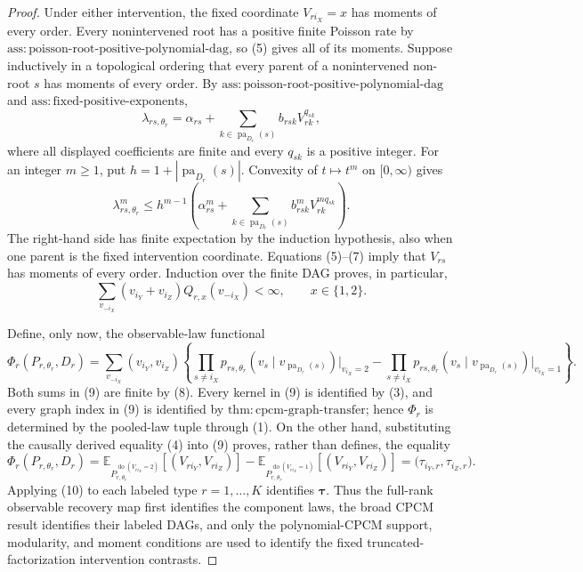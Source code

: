 \documentclass{article}
\begin{document}
\begin{proof}
Under either intervention, the fixed coordinate \(V_{r i_X}=x\) has moments of every order.  Every nonintervened root has a positive finite Poisson rate by \(\mathrm{ass{:}poisson\text{-}root\text{-}positive\text{-}polynomial\text{-}dag}\), so (5) gives all of its moments.  Suppose inductively in a topological ordering that every parent of a nonintervened non-root \(s\) has moments of every order.  By \(\mathrm{ass{:}poisson\text{-}root\text{-}positive\text{-}polynomial\text{-}dag}\) and \(\mathrm{ass{:}fixed\text{-}positive\text{-}exponents}\),
\[
\lambda_{rs,\theta_r}
=\alpha_{rs}+
\sum_{k\in\operatorname{pa}_{D_r}(s)}
b_{rsk}V_{rk}^{q_{sk}}, \tag{6}
\]
where all displayed coefficients are finite and every \(q_{sk}\) is a positive integer.  For an integer \(m\geq1\), put \(h=1+|\operatorname{pa}_{D_r}(s)|\).  Convexity of \(t\mapsto t^m\) on \([0,\infty)\) gives
\[
\lambda_{rs,\theta_r}^{m}
\leq h^{m-1}\!\left(
\alpha_{rs}^{m}+
\sum_{k\in\operatorname{pa}_{D_r}(s)}
b_{rsk}^{m}V_{rk}^{m q_{sk}}
\right). \tag{7}
\]
The right-hand side has finite expectation by the induction hypothesis, also when one parent is the fixed intervention coordinate.  Equations (5)--(7) imply that \(V_{rs}\) has moments of every order.  Induction over the finite DAG proves, in particular,
\[
\sum_{v_{-i_X}}(v_{i_Y}+v_{i_Z})Q_{r,x}(v_{-i_X})<\infty,
\qquad x\in\{1,2\}. \tag{8}
\]

Define, only now, the observable-law functional
\[
\Phi_r(P_{r,\theta_r},D_r)
=\sum_{v_{-i_X}}(v_{i_Y},v_{i_Z})
\left\{
\prod_{s\ne i_X}p_{rs,\theta_r}\!\left(v_s\mid
v_{\operatorname{pa}_{D_r}(s)}\right)\Big|_{v_{i_X}=2}
-
\prod_{s\ne i_X}p_{rs,\theta_r}\!\left(v_s\mid
v_{\operatorname{pa}_{D_r}(s)}\right)\Big|_{v_{i_X}=1}
\right\}. \tag{9}
\]
Both sums in (9) are finite by (8).  Every kernel in (9) is identified by (3), and every graph index in (9) is identified by \(\mathrm{thm{:}cpcm\text{-}graph\text{-}transfer}\); hence \(\Phi_r\) is determined by the pooled-law tuple through (1).  On the other hand, substituting the causally derived equality (4) into (9) proves, rather than defines, the equality
\[
\Phi_r(P_{r,\theta_r},D_r)
=\mathbb E_{P_{r,\theta_r}^{\operatorname{do}(V_{r i_X}=2)}}
[(V_{r i_Y},V_{r i_Z})]
-\mathbb E_{P_{r,\theta_r}^{\operatorname{do}(V_{r i_X}=1)}}
[(V_{r i_Y},V_{r i_Z})]
=\bigl(\tau_{i_Y,r},\tau_{i_Z,r}\bigr). \tag{10}
\]
Applying (10) to each labeled type \(r=1,\ldots,K\) identifies \(\boldsymbol\tau\).  Thus the full-rank observable recovery map first identifies the component laws, the broad CPCM result identifies their labeled DAGs, and only the polynomial-CPCM support, modularity, and moment conditions are used to identify the fixed truncated-factorization intervention contrasts.
\end{proof}
\end{document}
